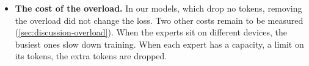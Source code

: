 \begin{itemize}
  \item \textbf{The cost of the overload.} In our models, which drop no tokens, removing the overload did not change the loss. Two other costs remain to be measured (\cref{sec:discussion-overload}). When the experts sit on different devices, the busiest ones slow down training. When each expert has a capacity, a limit on its tokens, the extra tokens are dropped.
\end{itemize}
